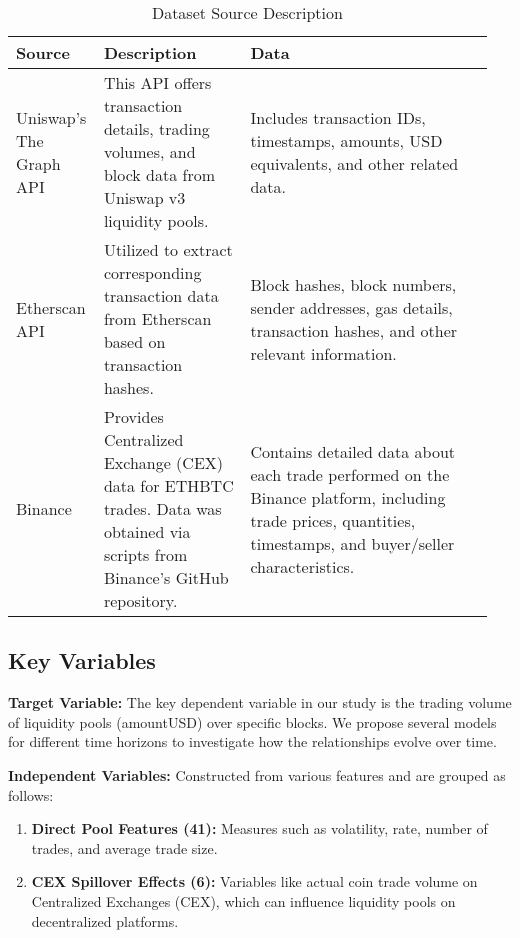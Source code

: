 \documentclass{article}
\begin{document}
\begin{table}[ht]
  \centering
  \small
  \begin{tabular}{|p{0.15\linewidth}|p{0.30\linewidth}|p{0.5\linewidth}|}
  \hline
  \textbf{Source} & \textbf{Description} & \textbf{Data} \\
  \hline
  Uniswap's The Graph API\cite{uniswapAPI} & This API offers transaction details, trading volumes, and block data from Uniswap v3 liquidity pools. & Includes transaction IDs, timestamps, amounts, USD equivalents, and other related data. \\
  \hline
  Etherscan API\cite{etherscanAPI} & Utilized to extract corresponding transaction data from Etherscan based on transaction hashes. & Block hashes, block numbers, sender addresses, gas details, transaction hashes, and other relevant information. \\
  \hline
  Binance\cite{binanceData} & Provides Centralized Exchange (CEX) data for ETHBTC trades. Data was obtained via scripts from Binance's GitHub repository. & Contains detailed data about each trade performed on the Binance platform, including trade prices, quantities, timestamps, and buyer/seller characteristics. \\
  \hline
  \end{tabular}
  \caption{Dataset Source Description}
  \label{tab:dataset-description}
  \end{table}

\subsection{\textbf{Key Variables}}

\textbf{Target Variable:} The key dependent variable in our study is the trading volume of liquidity pools (amountUSD) over specific blocks. We propose several models for different time horizons to investigate how the relationships evolve over time.

\textbf{Independent Variables:} Constructed from various features and are grouped as follows:

\begin{enumerate}[label=\arabic*. ,itemsep=0pt, topsep=0pt]
\item \textbf{Direct Pool Features (41):} Measures such as volatility, rate, number of trades, and average trade size.
\item \textbf{CEX Spillover Effects (6):} Variables like actual coin trade volume on Centralized Exchanges (CEX), which can influence liquidity pools on decentralized platforms.
\end{enumerate}
\end{document}
